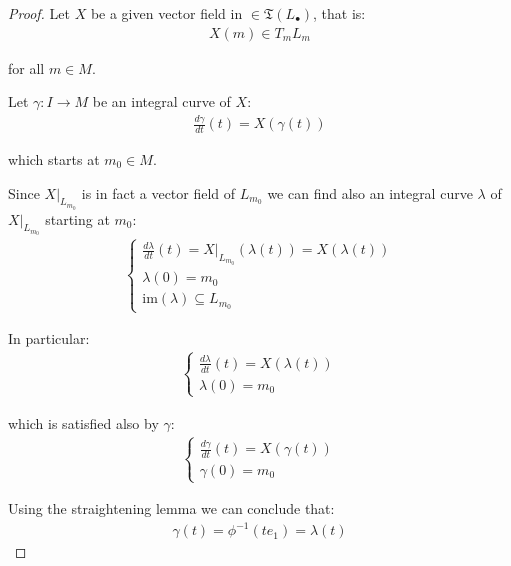     \begin{proof}
        Let $X$ be a given vector field in $\in \mathfrak{T}(L_\bullet)$, that is:
        \begin{align*}
            X(m) \in T_m L_m
        \end{align*}

        for all $m \in M$.

        Let $\gamma : I \to M$ be an integral curve of $X$:
        \begin{align*}
            \frac{d \gamma}{dt}(t) = X(\gamma(t))
        \end{align*}

        which starts at $m_0 \in M$.

        Since $X|_{L_{m_0}}$ is in fact a vector field of $L_{m_0}$ we can find also an integral curve $\lambda$ of $X|_{L_{m_0}}$ starting at $m_0$:
        \begin{align*}
            \begin{cases}
                \frac{d \lambda}{dt}(t) = X|_{L_{m_0}}(\lambda(t)) = X(\lambda(t)) \\
                \lambda(0) = m_0 \\
                \text{im}(\lambda) \subseteq L_{m_0}
            \end{cases}
        \end{align*}

        In particular:
        \begin{align*}
            \begin{cases}
                \frac{d \lambda}{dt}(t) = X(\lambda(t)) \\
                \lambda(0) = m_0
            \end{cases}
        \end{align*}

        which is satisfied also by $\gamma$:
        \begin{align*}
            \begin{cases}
                \frac{d \gamma}{dt}(t) = X(\gamma(t)) \\
                \gamma(0) = m_0
            \end{cases}	
        \end{align*}

        Using the straightening lemma we can conclude that:
        \begin{align*}
            \gamma(t) = \phi^{-1}(t e_1) = \lambda(t)
        \end{align*}


\end{proof}
